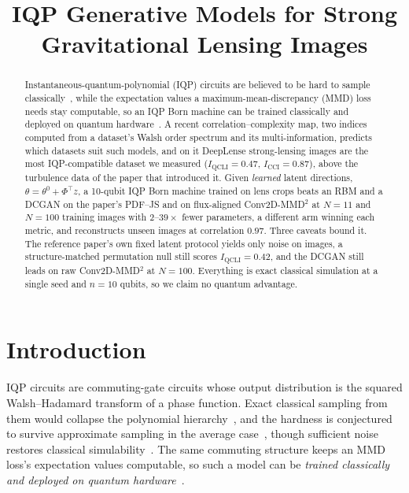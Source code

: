\documentclass{article}
\title{IQP Generative Models for Strong Gravitational Lensing Images}
\author{}
\newcommand{\qcli}{I_{\mathrm{QCLI}}}
\newcommand{\cci}{I_{\mathrm{CCI}}}
\begin{document}
\maketitle

\begin{abstract}
Instantaneous-quantum-polynomial (IQP) circuits are believed to be hard to sample
classically~\cite{bremner_2011_classical,bremner_2016_average}, while the expectation values a
maximum-mean-discrepancy (MMD) loss needs stay computable, so an IQP Born machine can be trained
classically and deployed on quantum hardware~\cite{recio_2025_train}. A recent
correlation--complexity map, two indices computed from a dataset's Walsh order spectrum and its
multi-information, predicts which datasets suit such models, and on it DeepLense
strong-lensing images are the most IQP-compatible dataset we measured ($\qcli = 0.47$,
$\cci = 0.87$), above the turbulence data of the paper that introduced it. Given \emph{learned} latent directions,
$\theta = \theta^{0} + \Phi^{\!\top} z$, a 10-qubit IQP Born machine trained on lens crops beats an
RBM and a DCGAN on the paper's PDF--JS and on flux-aligned Conv2D-MMD$^2$ at $N = 11$ and
$N = 100$ training images with $2$--$39\times$ fewer parameters, a different arm winning each
metric, and reconstructs unseen images at correlation $0.97$. Three caveats
bound it. The reference paper's own fixed latent protocol yields only noise on images, a
structure-matched permutation null still scores $\qcli = 0.42$, and the DCGAN still leads on raw
Conv2D-MMD$^2$ at $N = 100$. Everything is exact classical simulation at a single seed and $n = 10$
qubits, so we claim no quantum advantage.
\end{abstract}

\section{Introduction}
\label{sec:intro}

IQP circuits are commuting-gate circuits whose output distribution is the squared Walsh--Hadamard
transform of a phase function. Exact classical sampling from them would collapse the polynomial
hierarchy~\cite{bremner_2011_classical}, and the hardness is conjectured to survive approximate
sampling in the average case~\cite{bremner_2016_average,codsi_2025_classically}, though sufficient
noise restores classical simulability~\cite{rajakumar_2024_polynomial}. The same commuting structure
keeps an MMD loss's expectation values computable, so such a model can be \emph{trained classically
and deployed on quantum hardware}~\cite{recio_2025_train,recio_2025_iqpopt}.
\end{document}
